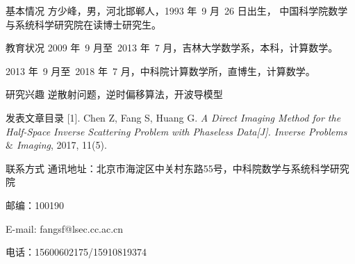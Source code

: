 ﻿
\begin{resume}

\begin{resumesection}{基本情况}
方少峰，男，河北邯郸人，1993 年~9 月~26 日出生，
中国科学院数学与系统科学研究院在读博士研究生。
\end{resumesection}

\begin{resumelist}{教育状况}
2009 年~9 月至~2013 年~7 月，吉林大学数学系，本科，计算数学。

2013 年~9 月至~2018 年~7 月，中科院计算数学所，直博生，计算数学。
\end{resumelist}

\begin{resumelist}{研究兴趣}
逆散射问题，逆时偏移算法，开波导模型
\end{resumelist}

\begin{resumelist}{发表文章目录}
[1]. Chen Z, Fang S, Huang G. {\it A Direct Imaging Method for the Half-Space Inverse Scattering Problem with Phaseless Data[J]. Inverse Problems $\&$ Imaging}, 2017, 11(5).
\end{resumelist}

\begin{resumelist}{联系方式}
通讯地址：北京市海淀区中关村东路55号，中科院数学与系统科学研究院

邮编：100190

E-mail: fangsf@lsec.cc.ac.cn

电话：15600602175/15910819374
\end{resumelist}

\end{resume}
